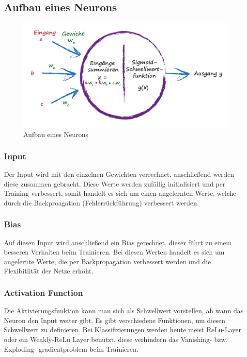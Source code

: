 \newpage
\subsection{Aufbau eines Neurons}
\begin{figure}[htb]
  \centering  
  \includegraphics[scale=0.5]{img/S41_Buildyourown.png}
  \caption{Aufbau eines Neurons  \cite{rashid2017neuronale}}
  \label{fig:neuron}

\end{figure}
\subsubsection{Input}
Der Input wird mit den einzelnen Gewichten verrechnet, anschließend werden diese zusammen gebracht. Diese Werte werden zufällig initialisiert und per Training verbessert, somit handelt es sich um einen angelernten Werte, welche durch die Backproagation (Fehlerrückführung) verbessert werden.

\subsubsection{Bias}
Auf diesen Input wird anschließend ein Bias gerechnet, dieser führt zu einem besseren Verhalten beim Trainieren. Bei diesen Werten handelt es sich um angelernte Werte, die per Backpropagation verbessert werden und die Flexibitlität der Netze erhöht.


\subsubsection{Activation Function}
Die Aktivierungsfunktion kann man sich als Schwellwert vorstellen, ab wann das Neuron den Input weiter gibt. Es gibt verschiedene Funktionen, um diesen Schwellwert zu definieren. Bei Klassifizierungen werden heute meist ReLu-Layer oder ein Weakly-ReLu Layer benutzt, diese verhindern das Vanishing- bzw. Exploding- gradientproblem beim Trainieren.

